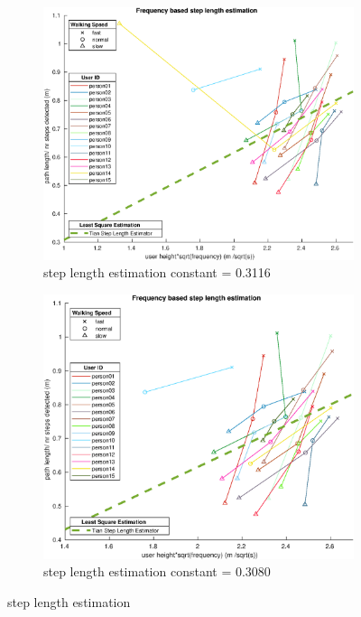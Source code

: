 \begin{figure}[H]
	\centering
	\begin{subfigure}[t]{.45\textwidth}
	\centering
	\includegraphics[width=\linewidth]{images/20201028_1050_step_length_all_data}
	\caption{step length estimation constant = 0.3116}
	\label{fig:step_length_all_data}
	\end{subfigure}
	\begin{subfigure}[t]{.45\textwidth}
		\centering
		\includegraphics[width=0.95\linewidth]{images/20201028_1051_step_length_good_data}
		\caption{step length estimation constant = 0.3080}
		\label{fig:step_length_without_faults}
	\end{subfigure}
	\caption{step length estimation}
	\label{fig:step_length_estimation}
\end{figure}
